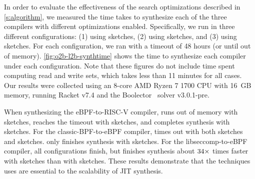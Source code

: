 In order to evaluate the effectiveness of the search optimizations
described in \autoref{s:algorithm}, we measured the time \jitsynth
takes to synthesize each of the three compilers with different optimizations
enabled.
%
Specifically, we run \jitsynth in three different configurations:
(1) using \Naive sketches, (2) using \RW sketches, and (3) using \LCS sketches.
%
For each configuration, we ran \jitsynth with a timeout of 48 hours (or until out of memory).
\autoref{fig:o2b-l2b-synthtime} shows the time to synthesize
each compiler under each configuration.
%
Note that these figures do not include time spent computing read and write sets,
which takes less than 11 minutes for all cases.
%
Our results were collected using an 8-core AMD Ryzen 7 1700 CPU with 16~GB memory,
running Racket v7.4 and the Boolector~\cite{niemetz:boolector} solver v3.0.1-pre.


When synthesizing the eBPF-to-RISC-V compiler,
\jitsynth runs out of memory with \Naive sketches,
reaches the timeout with \RW sketches,
and completes synthesis with \LCS sketches.
%
For the classic-BPF-to-eBPF compiler,
\jitsynth times out with both \Naive sketches and \RW sketches.
\jitsynth only finishes synthesis with \LCS sketches.
%
For the libseccomp-to-eBPF compiler, all configurations finish,
but \jitsynth finishes synthesis about $34\times$ times faster
with \LCS sketches than with \Naive sketches.
%
These results demonstrate that the techniques \jitsynth uses
are essential to the scalability of JIT synthesis.
